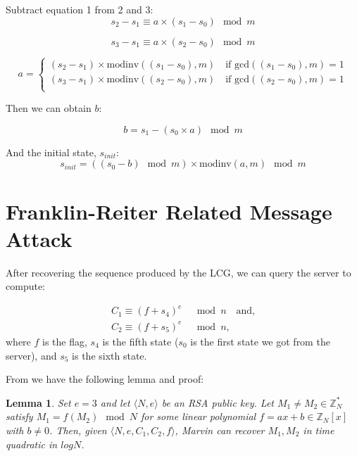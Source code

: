 \documentclass[12pt]{article}
\newtheorem{lemma}{Lemma}
\begin{document}
Subtract equation 1 from 2 and 3:
\begin{equation}
s_{2} - s_{1} \equiv a \times (s_{1} - s_{0}) \mod m
\end{equation}

\begin{equation}
	s_{3} - s_{1} \equiv a \times (s_{2} - s_{0}) \mod m
\end{equation}

\begin{equation}
	a =
		\begin{cases}
			(s_{2} - s_{1}) \times \text{modinv}((s_{1} - s_{0}), m) \quad \text{if gcd}((s_{1} - s_{0}), m) = 1 \\
			(s_{3} - s_{1}) \times \text{modinv}((s_{2} - s_{0}), m) \quad \text{if gcd}((s_{2} - s_{0}), m) = 1 \\
		\end{cases}
\end{equation}

Then we can obtain $b$:

\begin{equation}
	b = s_{1} - (s_{0} \times a) \mod m
\end{equation}

And the initial state, $s_{init}$:
\begin{equation}
	s_{init} = ((s_{0} - b) \mod m) \times \text{modinv}(a, m) \mod m
\end{equation}

\section{Franklin-Reiter Related Message Attack}
After recovering the sequence produced by the LCG, we can query the server to compute:

\begin{equation}
\begin{aligned}
	C_{1} \equiv (f + s_{4})^{e} & \mod n \quad \text{and,} \\
	C_{2} \equiv (f + s_{5})^{e} & \mod n,
\end{aligned}
\end{equation}
where $f$ is the flag, $s_{4}$ is the fifth state ($s_{0}$ is the first state we got from the server), and $s_{5}$ is the sixth state.

From \cite{boneh1999twenty} we have the following lemma and proof:

\begin{lemma}
Set $e = 3$ and let $\langle N, e\rangle$ be an RSA public key. Let $M_{1} \neq M_{2} \in \mathbb{Z}^{*}_{N}$ satisfy $M_{1} = f(M_{2}) \mod N$ for some linear polynomial $f = ax + b \in \mathbb{Z}_{N}[x]$ with $b \neq 0$. Then, given $\langle N, e, C_{1}, C_{2}, f\rangle$, Marvin can recover $M_{1}, M_{2}$ in time quadratic in $log N$.
\end{lemma}
\end{document}
